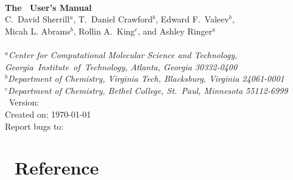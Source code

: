 \documentclass[12pt]{article}
\begin{document}


\begin{center}
\ \\
\vspace{2.0in}
{\bf {\Large The \PSIthree\ User's Manual}} \\
\vspace{0.5in}
C.~David Sherrill$^a$, T.~Daniel Crawford$^b$, Edward F.~Valeev$^b$, \\
Micah L. Abrams$^b$, Rollin A.~King$^c$, and Ashley Ringer$^a$ \\
\ \\
{\em $^a$Center for Computational Molecular Science and Technology, 
  \mbox{Georgia Institute of Technology,} Atlanta, Georgia 30332-0400} \\
\vspace{0.1in}
{\em $^b$Department of Chemistry, Virginia Tech, Blacksburg, Virginia 
  24061-0001} \\
\vspace{0.1in}
{\em $^c$Department of Chemistry, Bethel College, St.\ Paul, Minnesota 
  55112-6999}
\ \\
\vspace{0.3in}
\PSIthree\ Version: \PSIversion \\
Created on: \today \\
Report bugs to: \PSIemail \\
\end{center}

\thispagestyle{empty}

\newpage
\tableofcontents
\newpage





  
  
  
  
  




\appendix
\section{\PSIthree\ Reference}\label{PSI_Reference}


%



\end{document}
